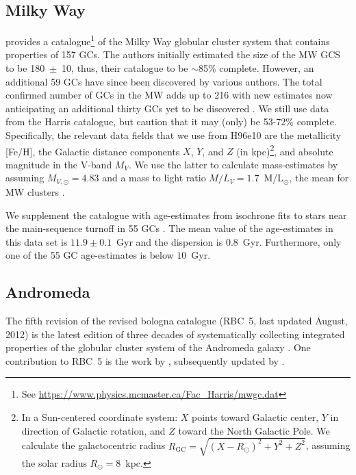 \documentclass[a4paper,fleqn,usenatbib]{mnras}
\begin{document}
\subsection{Milky Way}
\label{sec:milkyway}
\citet[][2010 edition; hereafter H96e10]{1996AJ....112.1487H} provides a
catalogue\footnote{See \url{https://www.physics.mcmaster.ca/Fac_Harris/mwgc.dat}}
of the Milky Way globular cluster system that contains properties of
157 GCs. The authors initially estimated the size of the MW GCS to be 180~$\pm$~10,
thus, their catalogue to be $\sim$85\% complete. However, an additional 59 GCs
have since been discovered by various authors. The total confirmed number of GCs
in the MW adds up to 216 with new estimates now anticipating an additional thirty
GCs yet to be discovered \citep[e.g.][and references therein]{2018ApJ...863L..38R}.
We still use data from the Harris catalogue, but caution that it may (only) be 
53-72\% complete. Specifically, the relevant data fields that we use from H96e10 
are the metallicity [Fe/H], the Galactic distance components $X$, $Y$, and $Z$ (in
kpc)\footnote{In a Sun-centered coordinate system: $X$ points toward Galactic
center, $Y$ in direction of Galactic rotation, and $Z$ toward the North Galactic
Pole. We calculate the galactocentric radius $R_{\text{GC}}=\sqrt{(X-R_\odot)^2
+ Y^2 + Z^2}$, assuming the solar radius $R_\odot=8$~kpc.}, and absolute
magnitude in the V-band $M_V$. We use the latter to calculate mass-estimates by
assuming $M_{V,\odot}=4.83$ and a mass to light ratio $M/L_V = 1.7$~M/L$_{\odot}$,
the mean for MW clusters \citep{2005ApJS..161..304M}.


We supplement the catalogue with age-estimates from isochrone fits to stars
near the main-sequence turnoff in 55 GCs \citep[][hereafter V13]{2013ApJ...775..134V}.
The mean value of the age-estimates in this data set is $11.9 \pm 0.1$~Gyr and
the dispersion is $0.8$~Gyr. Furthermore, only one of the 55 GC age-estimates is
below $10$~Gyr.

\subsection{Andromeda}
\label{sec:andromeda}
The fifth revision of the revised bologna catalogue (RBC~5, last updated
August, 2012) is the latest edition of three decades of systematically
collecting integrated properties of the globular cluster system of the
Andromeda galaxy \citep[][and references therein]{2004A&A...416..917G}. One
contribution to RBC~5 is the work by \citet[][hereafter C11]{2011AJ....141...61C},
subsequently updated by \citet[][hereafter CR16]{2016ApJ...824...42C}.
\end{document}
